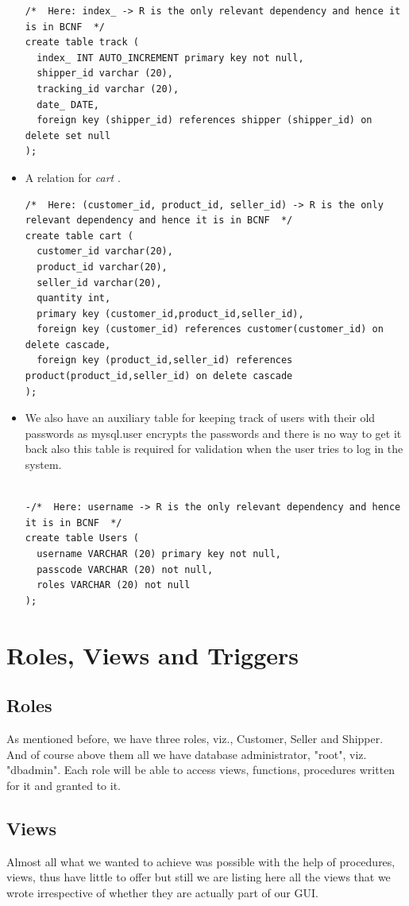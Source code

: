 \documentclass[a4paper,12pt]{article}
\newcommand{\ita}[1]{
    \textit{#1}
}
\begin{document}
\begin{itemize}
\begin{verbatim}
/*  Here: index_ -> R is the only relevant dependency and hence it is in BCNF  */
create table track (
  index_ INT AUTO_INCREMENT primary key not null,
  shipper_id varchar (20),
  tracking_id varchar (20),
  date_ DATE,
  foreign key (shipper_id) references shipper (shipper_id) on delete set null
);
  \end{verbatim}
  \item A relation for \ita{cart}.
  \begin{verbatim}
/*  Here: (customer_id, product_id, seller_id) -> R is the only relevant dependency and hence it is in BCNF  */
create table cart (
  customer_id varchar(20),
  product_id varchar(20),
  seller_id varchar(20),
  quantity int,
  primary key (customer_id,product_id,seller_id),
  foreign key (customer_id) references customer(customer_id) on delete cascade,
  foreign key (product_id,seller_id) references product(product_id,seller_id) on delete cascade
);
  \end{verbatim}
  \item We also have an auxiliary table for keeping track of users with their old passwords as mysql.user encrypts the passwords and there is no way to get it back also this table is required for validation when the user tries to log in the system.
  \begin{verbatim}

-/*  Here: username -> R is the only relevant dependency and hence it is in BCNF  */
create table Users (
  username VARCHAR (20) primary key not null,
  passcode VARCHAR (20) not null,
  roles VARCHAR (20) not null
);
  \end{verbatim}
\end{itemize}
\newpage
\section{Roles, Views and Triggers}
\subsection{Roles}
As mentioned before, we have three roles, viz., Customer, Seller and Shipper. And of course above them all we have database administrator, "root", viz. "dbadmin". Each role will be able to access views, functions, procedures written for it and granted to it.
\subsection{Views}
Almost all what we wanted to achieve was possible with the help of procedures, views, thus have little to offer but still we are listing here all the views that we wrote irrespective of whether they are actually part of our GUI.
\end{document}
